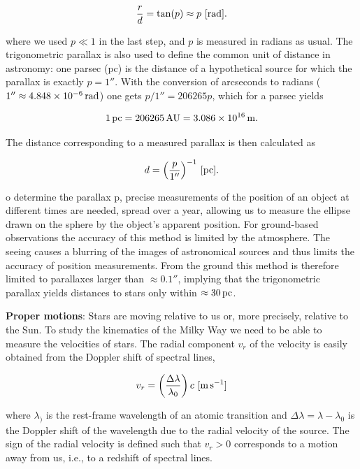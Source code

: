 \documentclass[a4paper,10pt]{article}
\begin{document}
\begin{align*}
    \frac{r}{d} = \tan(p) \approx p ~ [{\rm rad}].
\end{align*}

{\noindent}where we used $p\ll1$ in the last step, and $p$ is measured in radians as usual. The trigonometric parallax is also used to define the common unit of distance in astronomy: one parsec (pc) is the distance of a hypothetical source for which the parallax is exactly $p=1''$. With the conversion of arcseconds to radians ($1''\approx4.848\times10^{-6}\,{\rm rad}$) one gets $p/1''=206265p$, which for a parsec yields

\begin{align*}
    1\,{\rm pc} = 206265\,{\rm AU} = 3.086\times10^{16}\,{\rm m}.
\end{align*}

{\noindent}The distance corresponding to a measured parallax is then
calculated as

\begin{align*}
    d = \left(\frac{p}{1''}\right)^{-1}\,{[\rm pc]}.
\end{align*}

{\noindent}o determine the parallax p, precise measurements of the position of an object at different times are needed, spread over a year, allowing us to measure the ellipse drawn on the sphere by the object’s apparent position. For ground-based observations the accuracy of this method is limited by the atmosphere. The seeing causes a blurring of the images of astronomical sources and thus limits the accuracy of position measurements. From the ground this method is therefore limited to parallaxes larger than $\approx0.1''$, implying that the trigonometric parallax yields distances to stars only within $\approx30\,{\rm pc}$.

{\noindent}\textbf{Proper motions}: Stars are moving relative to us or, more precisely, relative to the Sun. To study the kinematics of the Milky Way we need to be able to measure the velocities of stars. The radial component $v_r$ of the velocity is easily obtained from the Doppler shift of spectral lines,

\begin{align*}
    v_r = \left(\frac{\Delta\lambda}{\lambda_0}\right)c ~ [{\rm m\,s^{-1}}]
\end{align*}

{\noindent}where $\lambda_)$ is the rest-frame wavelength of an atomic transition and $\Delta\lambda=\lambda-\lambda_0$ is the Doppler shift of the wavelength due to the radial velocity of the source. The sign of the radial velocity is defined such that $v_r>0$ corresponds to a motion away from us, i.e., to a redshift of spectral lines.
\end{document}
